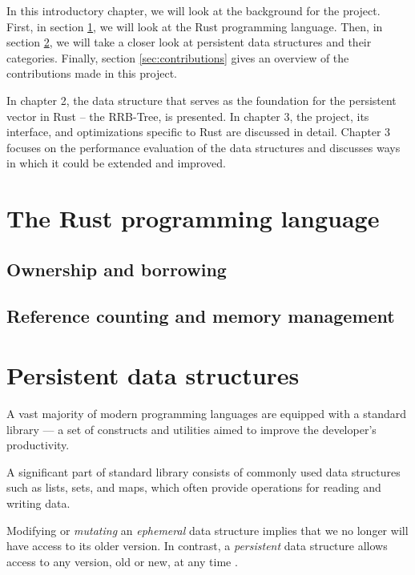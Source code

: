 In this introductory chapter, we will look at the background for the \pvecrs{} project. First, in section \ref{sec:rust}, we will look at the Rust programming language. Then, in section \ref{sec:psds}, we will take a closer look at persistent data structures and their categories. Finally, section \ref{sec:contributions} gives an overview of the contributions made in this project.

In chapter 2, the data structure that serves as the foundation for the persistent vector in Rust -- the RRB-Tree, is presented. In chapter 3, the \pvecrs{} project, its interface, and optimizations specific to Rust are discussed in detail. Chapter 3 focuses on the performance evaluation of the data structures and discusses ways in which it could be extended and improved.


\section{The Rust programming language}
\label{sec:rust}

\subsection{Ownership and borrowing}

\subsection{Reference counting and memory management}

\section{Persistent data structures}
\label{sec:psds}

A vast majority of modern programming languages are equipped with a standard library --- a set of constructs and utilities aimed to improve the developer's productivity. 

A significant part of standard library consists of commonly used data structures such as lists, sets, and maps, which often provide operations for reading and writing data. 

Modifying or \emph{mutating} an \emph{ephemeral} data structure implies that we no longer will have access to its older version. In contrast, a \emph{persistent} data structure allows access to any version, old or new, at any time \cite{making-data-structures-persistent}. 

